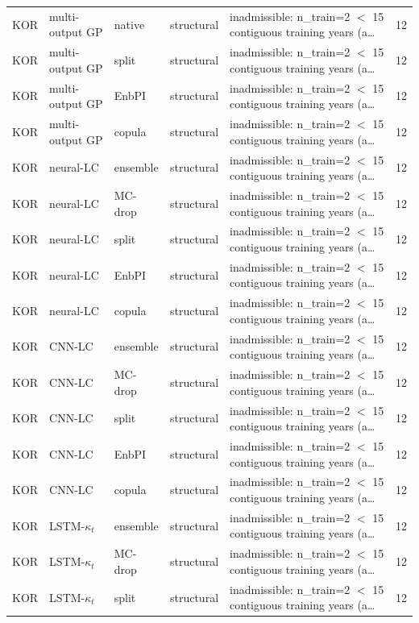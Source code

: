 {\begin{longtable}{@{}lllp{1.6cm}p{6.2cm}r@{}}
KOR & multi-output GP & native & structural & inadmissible: n\_train=2 $<$ 15 contiguous training years (a\ldots & 12 \\
KOR & multi-output GP & split & structural & inadmissible: n\_train=2 $<$ 15 contiguous training years (a\ldots & 12 \\
KOR & multi-output GP & EnbPI & structural & inadmissible: n\_train=2 $<$ 15 contiguous training years (a\ldots & 12 \\
KOR & multi-output GP & copula & structural & inadmissible: n\_train=2 $<$ 15 contiguous training years (a\ldots & 12 \\
KOR & neural-LC & ensemble & structural & inadmissible: n\_train=2 $<$ 15 contiguous training years (a\ldots & 12 \\
KOR & neural-LC & MC-drop & structural & inadmissible: n\_train=2 $<$ 15 contiguous training years (a\ldots & 12 \\
KOR & neural-LC & split & structural & inadmissible: n\_train=2 $<$ 15 contiguous training years (a\ldots & 12 \\
KOR & neural-LC & EnbPI & structural & inadmissible: n\_train=2 $<$ 15 contiguous training years (a\ldots & 12 \\
KOR & neural-LC & copula & structural & inadmissible: n\_train=2 $<$ 15 contiguous training years (a\ldots & 12 \\
KOR & CNN-LC & ensemble & structural & inadmissible: n\_train=2 $<$ 15 contiguous training years (a\ldots & 12 \\
KOR & CNN-LC & MC-drop & structural & inadmissible: n\_train=2 $<$ 15 contiguous training years (a\ldots & 12 \\
KOR & CNN-LC & split & structural & inadmissible: n\_train=2 $<$ 15 contiguous training years (a\ldots & 12 \\
KOR & CNN-LC & EnbPI & structural & inadmissible: n\_train=2 $<$ 15 contiguous training years (a\ldots & 12 \\
KOR & CNN-LC & copula & structural & inadmissible: n\_train=2 $<$ 15 contiguous training years (a\ldots & 12 \\
KOR & LSTM-$\kappa_t$ & ensemble & structural & inadmissible: n\_train=2 $<$ 15 contiguous training years (a\ldots & 12 \\
KOR & LSTM-$\kappa_t$ & MC-drop & structural & inadmissible: n\_train=2 $<$ 15 contiguous training years (a\ldots & 12 \\
KOR & LSTM-$\kappa_t$ & split & structural & inadmissible: n\_train=2 $<$ 15 contiguous training years (a\ldots & 12 \\

\end{longtable}}
